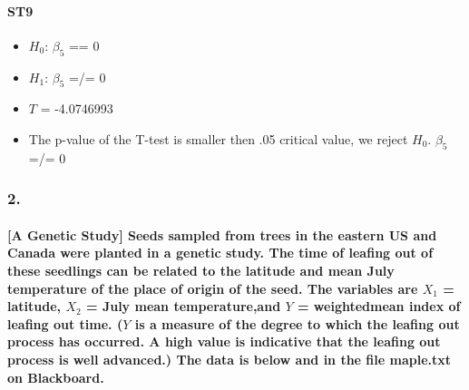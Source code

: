 \documentclass[]{article}
\providecommand{\tightlist}{%
  \setlength{\itemsep}{0pt}\setlength{\parskip}{0pt}}
\let\oldparagraph\paragraph
\renewcommand{\paragraph}[1]{\oldparagraph{#1}\mbox{}}
\begin{document}
\paragraph{ST9}\label{st9}

\begin{itemize}
\tightlist
\item
  \(H_{0}\): \(\beta_{5}\) == 0
\item
  \(H_{1}\): \(\beta_{5}\) =/= 0
\item
  \(T\) = -4.0746993
\item
  The p-value of the T-test is smaller then .05 critical value, we
  reject \(H_{0}\). \(\beta_{5}\) =/= 0 
\end{itemize}

\subsubsection{2.}\label{section-1}

\paragraph{\texorpdfstring{{[}A Genetic Study{]} Seeds sampled from
trees in the eastern US and Canada were planted in a genetic study. The
time of leafing out of these seedlings can be related to the latitude
and mean July temperature of the place of origin of the seed. The
variables are \(X_{1}\) = latitude, \(X_{2}\) = July mean
temperature,and \(Y\) = weightedmean index of leafing out time. (\(Y\)
is a measure of the degree to which the leafing out process has
occurred. A high value is indicative that the leafing out process is
well advanced.) The data is below and in the file maple.txt on
Blackboard.}{{[}A Genetic Study{]} Seeds sampled from trees in the eastern US and Canada were planted in a genetic study. The time of leafing out of these seedlings can be related to the latitude and mean July temperature of the place of origin of the seed. The variables are X\_\{1\} = latitude, X\_\{2\} = July mean temperature,and Y = weightedmean index of leafing out time. (Y is a measure of the degree to which the leafing out process has occurred. A high value is indicative that the leafing out process is well advanced.) The data is below and in the file maple.txt on Blackboard.}}\label{a-genetic-study-seeds-sampled-from-trees-in-the-eastern-us-and-canada-were-planted-in-a-genetic-study.-the-time-of-leafing-out-of-these-seedlings-can-be-related-to-the-latitude-and-mean-july-temperature-of-the-place-of-origin-of-the-seed.-the-variables-are-x_1-latitude-x_2-july-mean-temperatureand-y-weightedmean-index-of-leafing-out-time.-y-is-a-measure-of-the-degree-to-which-the-leafing-out-process-has-occurred.-a-high-value-is-indicative-that-the-leafing-out-process-is-well-advanced.-the-data-is-below-and-in-the-file-maple.txt-on-blackboard.}
\end{document}
